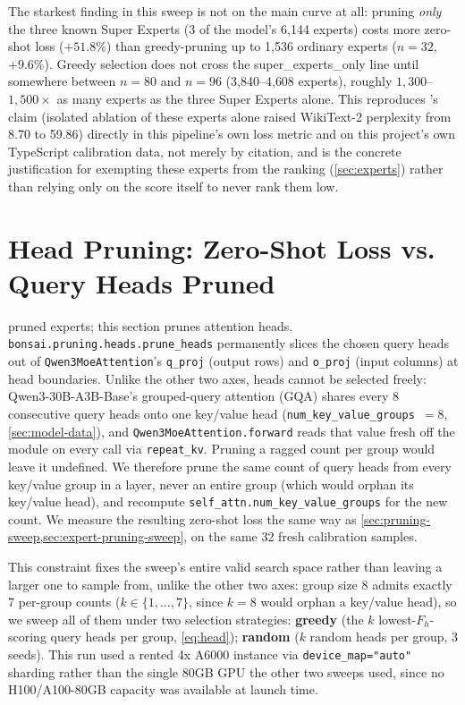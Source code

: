 \documentclass{article}
\theoremstyle{plain}
\theoremstyle{definition}
\theoremstyle{remark}
\begin{document}
The starkest finding in this sweep is not on the main curve at all: pruning
\emph{only} the three known Super Experts (3 of the model's 6{,}144
experts) costs more zero-shot loss ($+51.8\%$) than greedy-pruning up to
1{,}536 ordinary experts ($n=32$, $+9.6\%$). Greedy selection does not cross
the super\_experts\_only line until somewhere between $n=80$ and $n=96$
(3{,}840--4{,}608 experts), roughly $1{,}300$--$1{,}500\times$ as many
experts as the three Super Experts alone. This reproduces
\citet{superexperts2025}'s claim (isolated ablation of these experts alone
raised WikiText-2 perplexity from 8.70 to 59.86) directly in this
pipeline's own loss metric and on this project's own TypeScript calibration
data, not merely by citation, and is the concrete justification for
exempting these experts from the ranking (\cref{sec:experts}) rather than
relying only on the score itself to never rank them low.

\section{Head Pruning: Zero-Shot Loss vs. Query Heads Pruned}
\label{sec:head-pruning-sweep}

 pruned experts; this section prunes
attention heads. \texttt{bonsai.pruning.heads.prune\_heads} permanently
slices the chosen query heads out of \texttt{Qwen3MoeAttention}'s
\texttt{q\_proj} (output rows) and \texttt{o\_proj} (input columns) at
head boundaries. Unlike the other two axes, heads cannot be selected
freely: Qwen3-30B-A3B-Base's grouped-query attention (GQA) shares every 8
consecutive query heads onto one key/value head
(\texttt{num\_key\_value\_groups}~$=8$, \cref{sec:model-data}), and
\texttt{Qwen3MoeAttention.forward} reads that value fresh off the module
on every call via \texttt{repeat\_kv}. Pruning a ragged count per group
would leave it undefined. We therefore prune the same count of query
heads from every key/value group in a layer, never an entire group
(which would orphan its key/value head), and recompute
\texttt{self\_attn.num\_key\_value\_groups} for the new count. We measure
the resulting zero-shot loss the same way as
\cref{sec:pruning-sweep,sec:expert-pruning-sweep}, on the same 32 fresh
calibration samples.

This constraint fixes the sweep's entire valid search space rather than
leaving a larger one to sample from, unlike the other two axes: group
size 8 admits exactly 7 per-group counts ($k \in \{1,\dots,7\}$, since
$k=8$ would orphan a key/value head), so we sweep all of them under two
selection strategies: \textbf{greedy} (the $k$ lowest-$F_h$-scoring query
heads per group, \cref{eq:head}); \textbf{random} ($k$ random heads per
group, 3 seeds). This run used a rented 4x A6000 instance via
\texttt{device\_map="auto"} sharding rather than the single 80GB GPU the
other two sweeps used, since no H100/A100-80GB capacity was available at
launch time.
\end{document}

